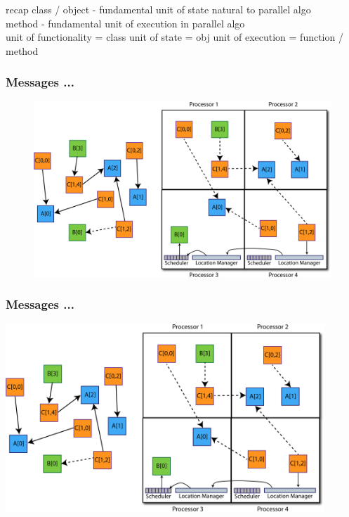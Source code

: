 \begin{frame}
recap
    class / object - fundamental unit of state natural to parallel algo\\
    method - fundamental unit of execution in parallel algo\\
unit of functionality = class
unit of state = obj
unit of execution = function / method
\end{frame}


\begin{frame}
  \frametitle{Messages ...
  }
  \begin{figure}
  \includegraphics[trim=0in 0in 14in 2in, clip=true, height=0.85\textheight]{../figures/elements2.pdf}
  \end{figure}
\end{frame}


\begin{frame}
  \frametitle{Messages ...
  }
  \begin{center}\includegraphics[width=0.9\textwidth]{../figures/elements2.pdf}\end{center}
\end{frame}



